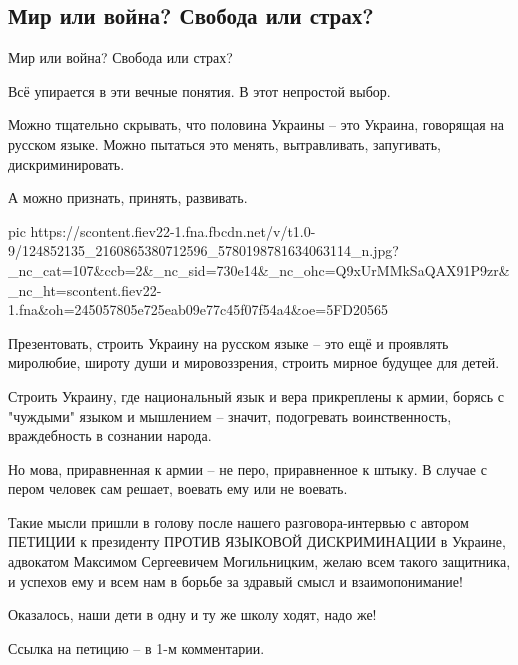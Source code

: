  
 
 
\subsection{Мир или война? Свобода или страх?}
\label{sec:10_11_2020.fb.roman_barashev.1.mir_ili_vojna}


Мир или война?  Свобода или страх?

Всё упирается в эти вечные понятия. В этот непростой выбор.

Можно тщательно скрывать, что половина Украины -- это Украина, говорящая на
русском языке. Можно пытаться это менять, вытравливать, запугивать,
дискриминировать. 

А можно признать, принять, развивать.

\ifcmt
pic https://scontent.fiev22-1.fna.fbcdn.net/v/t1.0-9/124852135_2160865380712596_5780198781634063114_n.jpg?_nc_cat=107&ccb=2&_nc_sid=730e14&_nc_ohc=Q9xUrMMkSaQAX91P9zr&_nc_ht=scontent.fiev22-1.fna&oh=245057805e725eab09e77c45f07f54a4&oe=5FD20565
\fi

Презентовать, строить Украину на русском языке -- это ещё и проявлять
миролюбие, широту души и мировоззрения, строить мирное будущее для детей.

Строить Украину, где национальный язык и вера прикреплены к армии, борясь с
"чуждыми" языком и мышлением -- значит, подогревать воинственность,
враждебность в сознании народа.

Но мова, приравненная к армии -- не перо, приравненное к штыку. В случае с
пером человек сам решает, воевать ему или не воевать. 

Такие мысли пришли в голову после нашего разговора-интервью с автором ПЕТИЦИИ к
президенту ПРОТИВ ЯЗЫКОВОЙ ДИСКРИМИНАЦИИ в Украине, адвокатом Максимом
Сергеевичем Могильницким, желаю всем такого защитника, и успехов ему и всем нам
в борьбе за здравый смысл и взаимопонимание! 

Оказалось, наши дети в одну и ту же школу ходят, надо же!

Ссылка на петицию -- в 1-м комментарии.
